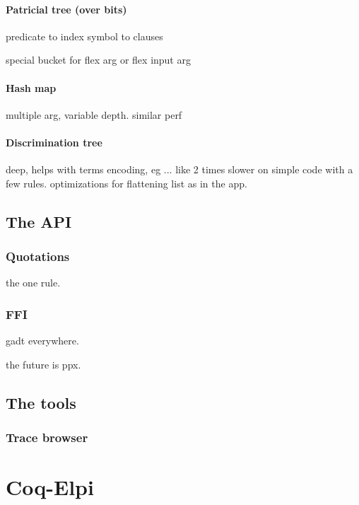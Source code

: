 \documentclass[a4paper, 11pt]{book}
\begin{document}
\subsubsection{Patricial tree (over bits)}

predicate to index
symbol to clauses

special bucket for flex arg or flex input arg

\subsubsection{Hash map}

multiple arg, variable depth. similar perf

\subsubsection{Discrimination tree}

deep, helps with terms encoding, eg ...
like 2 times slower on simple code with a few rules.
optimizations for flattening list as in the app.

\section{The API}

\subsection{Quotations}

the one rule.

\subsection{FFI}
gadt everywhere.

the future is ppx.

\section{The tools}

\subsection{Trace browser}

\chapter{Coq-Elpi}
\end{document}
